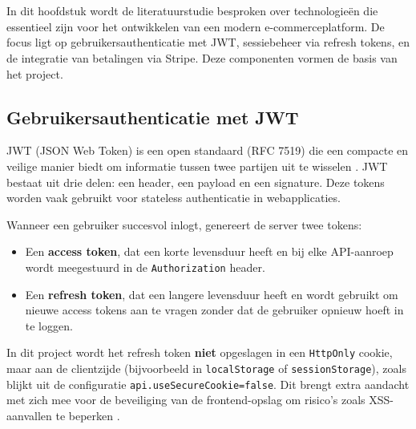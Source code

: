\chapter{}%
\label{ch:stand-van-zaken}



In dit hoofdstuk wordt de literatuurstudie besproken over technologieën die essentieel zijn voor het ontwikkelen van een modern e-commerceplatform. De focus ligt op gebruikersauthenticatie met JWT, sessiebeheer via refresh tokens, en de integratie van betalingen via Stripe. Deze componenten vormen de basis van het project.

\section{Gebruikersauthenticatie met JWT}

JWT (JSON Web Token) is een open standaard (RFC 7519) die een compacte en veilige manier biedt om informatie tussen twee partijen uit te wisselen \autocite{Jones2015}. JWT bestaat uit drie delen: een header, een payload en een signature. Deze tokens worden vaak gebruikt voor stateless authenticatie in webapplicaties.

Wanneer een gebruiker succesvol inlogt, genereert de server twee tokens:

\begin{itemize}
\item Een \textbf{access token}, dat een korte levensduur heeft en bij elke API-aanroep wordt meegestuurd in de \texttt{Authorization} header.
\item Een \textbf{refresh token}, dat een langere levensduur heeft en wordt gebruikt om nieuwe access tokens aan te vragen zonder dat de gebruiker opnieuw hoeft in te loggen.
\end{itemize}


In dit project wordt het refresh token \textbf{niet} opgeslagen in een \texttt{HttpOnly} cookie, maar aan de clientzijde (bijvoorbeeld in \texttt{localStorage} of \texttt{sessionStorage}), zoals blijkt uit de configuratie \texttt{api.useSecureCookie=false}. Dit brengt extra aandacht met zich mee voor de beveiliging van de frontend-opslag om risico’s zoals XSS-aanvallen te beperken \autocite{OWASP2021}.

